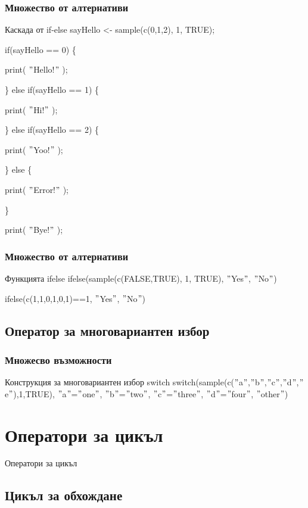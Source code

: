 \documentclass{beamer}
\begin{document}
\begin{frame}
\frametitle{Множество от алтернативи}
\begin{block}{Каскада от if-else}
sayHello <- sample(c(0,1,2), 1, TRUE);

if(sayHello == 0) \{

	print( $"$Hello!$"$ );

\} else if(sayHello == 1) \{

	print( $"$Hi!$"$ );

\} else if(sayHello == 2) \{

	print( $"$Yoo!$"$ );

\} else \{

	print( $"$Error!$"$ );

\}

print( $"$Bye!$"$ );
\end{block}
\end{frame}

\begin{frame}
\frametitle{Множество от алтернативи}
\begin{block}{Функцията ifelse}
ifelse(sample(c(FALSE,TRUE), 1, TRUE), $"$Yes$"$, $"$No$"$)

ifelse(c(1,1,0,1,0,1)==1, $"$Yes$"$, $"$No$"$)
\end{block}
\end{frame}

\subsection{Оператор за многовариантен избор}

\begin{frame}
\frametitle{Множесво възможности}
\begin{block}{Конструкция за многовариантен избор switch}
switch(sample(c($"$a$"$,$"$b$"$,$"$c$"$,$"$d$"$,$"$e$"$),1,TRUE), $"$a$"$=$"$one$"$, $"$b$"$=$"$two$"$, $"$c$"$=$"$three$"$, $"$d$"$=$"$four$"$, $"$other$"$)
\end{block}
\end{frame}

\section{Оператори за цикъл}

\begin{frame}
\center \huge{Оператори за цикъл}
\end{frame}

\subsection{Цикъл за обхождане}
\end{document}
